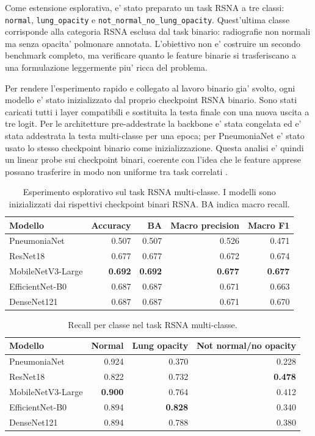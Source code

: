 \documentclass[11pt,a4paper]{article}
\begin{document}
Come estensione esplorativa, e' stato preparato un task RSNA a tre classi:
\texttt{normal}, \texttt{lung\_opacity} e
\texttt{not\_normal\_no\_lung\_opacity}. Quest'ultima classe corrisponde alla
categoria RSNA esclusa dal task binario: radiografie non normali ma senza
opacita' polmonare annotata. L'obiettivo non e' costruire un secondo benchmark
completo, ma verificare quanto le feature binarie si trasferiscano a una
formulazione leggermente piu' ricca del problema.

Per rendere l'esperimento rapido e collegato al lavoro binario gia' svolto, ogni
modello e' stato inizializzato dal proprio checkpoint RSNA binario. Sono stati
caricati tutti i layer compatibili e sostituita la testa finale con una nuova
uscita a tre logit. Per le architetture pre-addestrate la backbone e' stata
congelata ed e' stata addestrata la testa multi-classe per una epoca; per
PneumoniaNet e' stato usato lo stesso checkpoint binario come inizializzazione.
Questa analisi e' quindi un linear probe sui checkpoint binari, coerente con
l'idea che le feature apprese possano trasferire in modo non uniforme tra task
correlati \cite{yosinski2014transferable}.

\begin{table}[H]
\centering
\caption{Esperimento esplorativo sul task RSNA multi-classe. I modelli sono inizializzati dai rispettivi checkpoint binari RSNA. BA indica macro recall.}
\begin{tabular}{lrrrr}
\toprule
Modello & Accuracy & BA & Macro precision & Macro F1 \\
\midrule
PneumoniaNet & 0.507 & 0.507 & 0.526 & 0.471 \\
ResNet18 & 0.677 & 0.677 & 0.672 & 0.674 \\
MobileNetV3-Large & \textbf{0.692} & \textbf{0.692} & \textbf{0.677} & \textbf{0.677} \\
EfficientNet-B0 & 0.687 & 0.687 & 0.671 & 0.663 \\
DenseNet121 & 0.687 & 0.687 & 0.671 & 0.670 \\
\bottomrule
\end{tabular}
\end{table}

\begin{table}[H]
\centering
\caption{Recall per classe nel task RSNA multi-classe.}
\begin{tabular}{lrrr}
\toprule
Modello & Normal & Lung opacity & Not normal/no opacity \\
\midrule
PneumoniaNet & 0.924 & 0.370 & 0.228 \\
ResNet18 & 0.822 & 0.732 & \textbf{0.478} \\
MobileNetV3-Large & \textbf{0.900} & 0.764 & 0.412 \\
EfficientNet-B0 & 0.894 & \textbf{0.828} & 0.340 \\
DenseNet121 & 0.894 & 0.788 & 0.380 \\
\bottomrule
\end{tabular}
\end{table}
\end{document}
